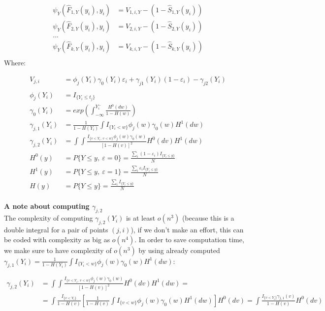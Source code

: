 \documentclass[]{article}
\let\epsilon\varepsilon
\begin{document}
$$
  \begin{aligned}
    \psi_{Y}(\hat{F}_{1,Y}(y_i), y_i) &= V_{1,i,Y} - \left(   1- \hat{S}_{1,Y}(y_i)   \right)\\
    \psi_{Y}(\hat{F}_{2,Y}(y_i), y_i) &= V_{2,i,Y} -  \left(   1- \hat{S}_{2,Y}(y_i)   \right)\\
    ...\\
    \psi_{Y}(\hat{F}_{k,Y}(y_i), y_i) &= V_{k,i,Y} -  \left(   1- \hat{S}_{k,Y}(y_i)   \right)\\
  \end{aligned}
$$
Where:

$$
  \begin{aligned}
    V_{j,i} &= \phi_j(Y_i) \gamma_0(Y_i) \epsilon_i + \gamma_{j1}(Y_i)(1 - \epsilon_i) - \gamma_{j2}(Y_i)\\
    ~\\
    \phi_j(Y_i) &= I_{\{ Y_i \leq t_j \}}\\
    \gamma_0(Y_i) &= exp\left(  \int_{-\infty}^{Y_i^-}  \frac{H^0(dw)}{1-H(w)}    \right) \\
    \gamma_{j,1}(Y_i) &=  \frac{1}{1-H(Y_i)}    \int I_{\{ Y_i<w \}} \phi_j(w)  \gamma_0(w)H^1(dw)   \\
    \gamma_{j,2}(Y_i) &=   \int \int   \frac{I_{\{ v<Y_i,~v<w \}} \phi_j(w) \gamma_0(w)}{[1-H(v)]^2}   H^0(dv)   H^1(dw)   \\
    H^0(y) &= P\{  Y\leq y, ~\epsilon = 0 \} = \frac{\sum_i(1-\epsilon_i)I_{\{ Y_i \leq y \}}}{N} \\
    H^1(y) &= P\{  Y\leq y, ~\epsilon = 1 \} = \frac{\sum_i\epsilon_iI_{\{ Y_i \leq y \}}}{N} \\
    H(y) &= P\{  Y\leq y\} = \frac{\sum_iI_{\{ Y_i \leq y \}}}{N} \\
  \end{aligned}
$$

\textbf{A note about computing $\gamma_{j,2}$}\\
The complexity of computing $\gamma_{j,2}(Y_i)$ is at least $o(n^3)$ (because this is a double integral for a pair of points $(j, i)$), if we don't make an effort, this can be coded with complexity as big as $o(n^4)$. In order to save computation time, we make sure to have complexity of $o(n^3)$ by using already computed $\gamma_{j,1}(Y_i)=\frac{1}{1-H(Y_i)}    \int I_{\{ Y_i<w \}} \phi_j(w)  \gamma_0(w)H^1(dw)  $:

$$
  \begin{aligned}
    \gamma_{j,2}(Y_i) &=  \int \int   \frac{I_{\{ v<Y_i,~v<w \}} \phi_j(w) \gamma_0(w)}{[1-H(v)]^2}   H^0(dv)   H^1(dw) =  \\ 
    &=  \int  \frac{I_{\{ v<Y_i \}}}{1-H(v)}  \left[  \frac{1}{1-H(v)}\int   I_{\{ v<w \}} \phi_j(w) \gamma_0(w)    H^1(dw) \right]  H^0(dv)  =  \int  \frac{I_{\{ v<Y_i \}}\gamma_{j,1}(v)}{1-H(v)}       H^0(dv) \\
  \end{aligned}
$$
\end{document}

